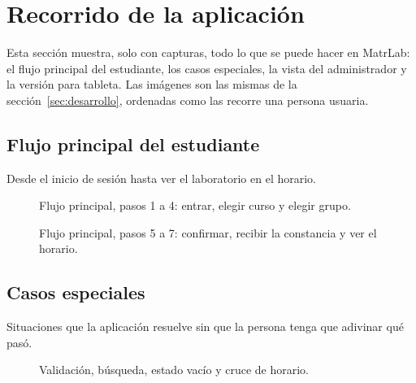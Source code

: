 \section{Recorrido de la aplicación}
\label{sec:recorrido}

Esta sección muestra, solo con capturas, todo lo que se puede hacer en MatrLab: el flujo principal del estudiante, los casos especiales, la vista del administrador y la versión para tableta. Las imágenes son las mismas de la sección~\ref{sec:desarrollo}, ordenadas como las recorre una persona usuaria.

\subsection{Flujo principal del estudiante}
Desde el inicio de sesión hasta ver el laboratorio en el horario.

\begin{figure}[H]
\centering
{}\hfill
{}\hfill
{}\hfill
{}
\caption{Flujo principal, pasos 1 a 4: entrar, elegir curso y elegir grupo.}
\end{figure}

\begin{figure}[H]
\centering
{}\hspace{0.04\textwidth}
\hspace{0.04\textwidth}
\caption{Flujo principal, pasos 5 a 7: confirmar, recibir la constancia y ver el horario.}
\end{figure}

\subsection{Casos especiales}
Situaciones que la aplicación resuelve sin que la persona tenga que adivinar qué pasó.

\begin{figure}[H]
\centering
{}\hfill
{}\hfill
{}\hfill
{}
\caption{Validación, búsqueda, estado vacío y cruce de horario.}
\end{figure}

